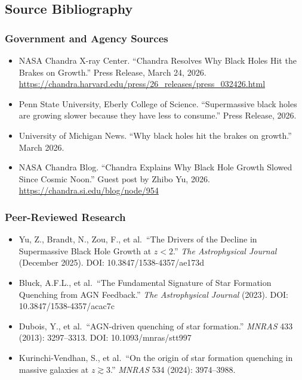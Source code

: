 \documentclass[11pt,letterpaper]{article}
\begin{document}
\subsection{Source Bibliography}

\subsubsection{Government and Agency Sources}

\begin{itemize}
  \item NASA Chandra X-ray Center. ``Chandra Resolves Why Black Holes Hit the Brakes on Growth.'' Press Release, March 24, 2026. \url{https://chandra.harvard.edu/press/26_releases/press_032426.html}
  \item Penn State University, Eberly College of Science. ``Supermassive black holes are growing slower because they have less to consume.'' Press Release, 2026.
  \item University of Michigan News. ``Why black holes hit the brakes on growth.'' March 2026.
  \item NASA Chandra Blog. ``Chandra Explains Why Black Hole Growth Slowed Since Cosmic Noon.'' Guest post by Zhibo Yu, 2026. \url{https://chandra.si.edu/blog/node/954}
\end{itemize}

\subsubsection{Peer-Reviewed Research}

\begin{itemize}
  \item Yu, Z., Brandt, N., Zou, F., et al.\ ``The Drivers of the Decline in Supermassive Black Hole Growth at $z < 2$.'' \textit{The Astrophysical Journal} (December 2025). DOI: 10.3847/1538-4357/ae173d
  \item Bluck, A.F.L., et al.\ ``The Fundamental Signature of Star Formation Quenching from AGN Feedback.'' \textit{The Astrophysical Journal} (2023). DOI: 10.3847/1538-4357/acac7c
  \item Dubois, Y., et al.\ ``AGN-driven quenching of star formation.'' \textit{MNRAS} 433 (2013): 3297--3313. DOI: 10.1093/mnras/stt997
  \item Kurinchi-Vendhan, S., et al.\ ``On the origin of star formation quenching in massive galaxies at $z \gtrsim 3$.'' \textit{MNRAS} 534 (2024): 3974--3988.
\end{itemize}
\end{document}
